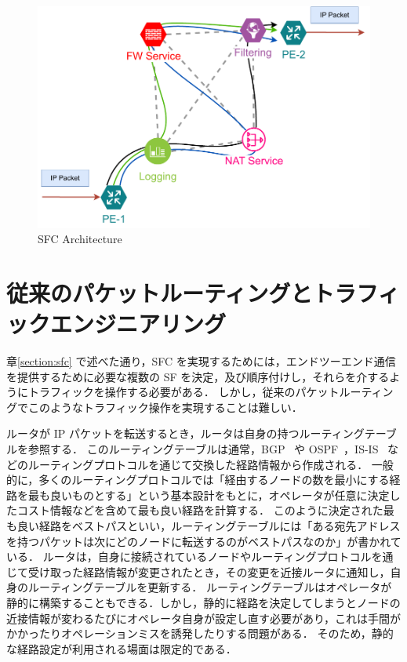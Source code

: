 \begin{figure}[t]
    \centering
    \includegraphics[width=0.95\linewidth]{img/SFC.pdf}
    \caption{SFC Architecture}
    \label{fig:sfc-arc}
\end{figure}

\section{従来のパケットルーティングとトラフィックエンジニアリング}
\label{section:src-rtng}

章\ref*{section:sfc} で述べた通り，SFC を実現するためには，エンドツーエンド通信を提供するために必要な複数の SF を決定，及び順序付けし，それらを介するようにトラフィックを操作する必要がある．
しかし，従来のパケットルーティングでこのようなトラフィック操作を実現することは難しい．

ルータが IP パケットを転送するとき，ルータは自身の持つルーティングテーブルを参照する．
このルーティングテーブルは通常，BGP~\cite{rfc4271} や OSPF~\cite{rfc2328}，IS-IS~\cite{rfc1142} などのルーティングプロトコルを通じて交換した経路情報から作成される．
一般的に，多くのルーティングプロトコルでは「経由するノードの数を最小にする経路を最も良いものとする」という基本設計をもとに，オペレータが任意に決定したコスト情報などを含めて最も良い経路を計算する．
このように決定された最も良い経路をベストパスといい，ルーティングテーブルには「ある宛先アドレスを持つパケットは次にどのノードに転送するのがベストパスなのか」が書かれている．
ルータは，自身に接続されているノードやルーティングプロトコルを通じて受け取った経路情報が変更されたとき，その変更を近接ルータに通知し，自身のルーティングテーブルを更新する．
ルーティングテーブルはオペレータが静的に構築することもできる．しかし，静的に経路を決定してしまうとノードの近接情報が変わるたびにオペレータ自身が設定し直す必要があり，これは手間がかかったりオペレーションミスを誘発したりする問題がある．
そのため，静的な経路設定が利用される場面は限定的である．

